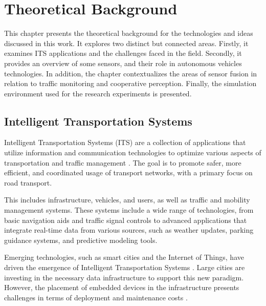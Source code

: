 \chapter{Theoretical Background}
\label{theoretical_background}

This chapter presents the theoretical background for the technologies and ideas discussed in this work. It explores two distinct but connected areas. Firstly, it examines ITS applications and the challenges faced in the field. Secondly, it provides an overview of some sensors, and their role in autonomous vehicles technologies. In addition, the chapter contextualizes the areas of sensor fusion in relation to traffic monitoring and cooperative perception. Finally, the simulation environment used for the research experiments is presented.

\section{Intelligent Transportation Systems}

Intelligent Transportation Systems (ITS) are a collection of applications that utilize information and communication technologies to optimize various aspects of transportation and traffic management \cite{chen2022constructing}. The goal is to promote safer, more efficient, and coordinated usage of transport networks, with a primary focus on road transport. 

This includes infrastructure, vehicles, and users, as well as traffic and mobility management systems. These systems include a wide range of technologies, from basic navigation aids and traffic signal controls to advanced applications that integrate real-time data from various sources, such as weather updates, parking guidance systems, and predictive modeling tools. 


Emerging technologies, such as smart cities and the Internet of Things, have driven the emergence of Intelligent Transportation Systems \cite{qureshi2013survey}. Large cities are investing in the necessary data infrastructure to support this new paradigm. However, the placement of embedded devices in the infrastructure presents challenges in terms of deployment and maintenance costs \cite{s18041212}.

